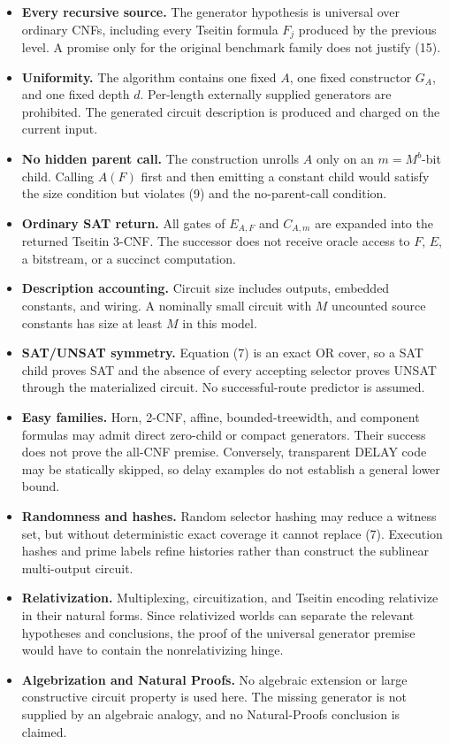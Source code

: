 \documentclass[11pt]{article}
\begin{document}
\begin{itemize}
\item[] \textbf{Every recursive source.}  The generator hypothesis is
universal over ordinary CNFs, including every Tseitin formula $F_j$ produced
by the previous level.  A promise only for the original benchmark family does
not justify (15).
\item[] \textbf{Uniformity.}  The algorithm contains one fixed $A$, one fixed
constructor $G_A$, and one fixed depth $d$.  Per-length externally supplied
generators are prohibited.  The generated circuit description is produced
and charged on the current input.
\item[] \textbf{No hidden parent call.}  The construction unrolls $A$ only on
an $m=M^b$-bit child.  Calling $A(F)$ first and then emitting a constant child
would satisfy the size condition but violates (9) and the no-parent-call
condition.
\item[] \textbf{Ordinary SAT return.}  All gates of $E_{A,F}$ and $C_{A,m}$
are expanded into the returned Tseitin 3-CNF.  The successor does not receive
oracle access to $F$, $E$, a bitstream, or a succinct computation.
\item[] \textbf{Description accounting.}  Circuit size includes outputs,
embedded constants, and wiring.  A nominally small circuit with $M$ uncounted
source constants has size at least $M$ in this model.
\item[] \textbf{SAT/UNSAT symmetry.}  Equation (7) is an exact OR cover, so a
SAT child proves SAT and the absence of every accepting selector proves UNSAT
through the materialized circuit.  No successful-route predictor is assumed.
\item[] \textbf{Easy families.}  Horn, 2-CNF, affine, bounded-treewidth, and
component formulas may admit direct zero-child or compact generators.  Their
success does not prove the all-CNF premise.  Conversely, transparent DELAY
code may be statically skipped, so delay examples do not establish a general
lower bound.
\item[] \textbf{Randomness and hashes.}  Random selector hashing may reduce a
witness set, but without deterministic exact coverage it cannot replace (7).
Execution hashes and prime labels refine histories rather than construct the
sublinear multi-output circuit.
\item[] \textbf{Relativization.}  Multiplexing, circuitization, and Tseitin
encoding relativize in their natural forms.  Since relativized worlds can
separate the relevant hypotheses and conclusions, the proof of the universal
generator premise would have to contain the nonrelativizing hinge.
\item[] \textbf{Algebrization and Natural Proofs.}  No algebraic extension or
large constructive circuit property is used here.  The missing generator is
not supplied by an algebraic analogy, and no Natural-Proofs conclusion is
claimed.
\end{itemize}
\end{document}
